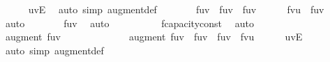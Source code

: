 {\ \ \ \ \isamarkupfalse%
\ {\isacartoucheopen}{\isacharparenleft}u{\isacharcomma}v{\isacharparenright}{\isasymin}E{\isacartoucheclose}\ \isamarkupfalse%
\ {\isacharparenleft}auto\ simp{\isacharcolon}\ augment{\isacharunderscore}def{\isacharparenright}\isanewline
\ \ \isamarkupfalse%
\ \isamarkupfalse%
\ {\isachardoublequoteopen}{\isasymdots}\ {\isasymge}\ f{\isacharparenleft}u{\isacharcomma}v{\isacharparenright}\ {\isacharplus}\ f{\isacharprime}{\isacharparenleft}u{\isacharcomma}v{\isacharparenright}\ {\isacharminus}\ f{\isacharparenleft}u{\isacharcomma}v{\isacharparenright}{\isachardoublequoteclose}\isanewline
\ \ \ \ \isamarkupfalse%
\ {\isacartoucheopen}f{\isacharprime}{\isacharparenleft}v{\isacharcomma}u{\isacharparenright}\ {\isasymle}\ f{\isacharparenleft}u{\isacharcomma}v{\isacharparenright}{\isacartoucheclose}\ \isamarkupfalse%
\ auto\isanewline
\ \ \isamarkupfalse%
\ \isamarkupfalse%
\ {\isachardoublequoteopen}{\isasymdots}\ {\isacharequal}\ f{\isacharprime}{\isacharparenleft}u{\isacharcomma}v{\isacharparenright}{\isachardoublequoteclose}\ \isamarkupfalse%
\ auto\isanewline
\ \ \isamarkupfalse%
\ \isamarkupfalse%
\ {\isachardoublequoteopen}{\isasymdots}\ {\isasymge}\ {}{\isachardoublequoteclose}\ \isamarkupfalse%
\ f{\isacharprime}{\isachardot}capacity{\isacharunderscore}const\ \isamarkupfalse%
\ auto\isanewline
\ \ \isamarkupfalse%
\ \isamarkupfalse%
\ {\isachardoublequoteopen}augment\ f{\isacharprime}{\isacharparenleft}u{\isacharcomma}v{\isacharparenright}\ {\isasymge}\ {}{\isachardoublequoteclose}\ \isacommand{{\isachardot}}\isamarkupfalse%
\isanewline
\ \ \ \ \ \ \isanewline
\ \ \isamarkupfalse%
\ {\isachardoublequoteopen}augment\ f{\isacharprime}{\isacharparenleft}u{\isacharcomma}v{\isacharparenright}\ {\isacharequal}\ f{\isacharparenleft}u{\isacharcomma}v{\isacharparenright}\ {\isacharplus}\ f{\isacharprime}{\isacharparenleft}u{\isacharcomma}v{\isacharparenright}\ {\isacharminus}\ f{\isacharprime}{\isacharparenleft}v{\isacharcomma}u{\isacharparenright}{\isachardoublequoteclose}\isanewline
\ \ \ \ \isamarkupfalse%
\ {\isacartoucheopen}{\isacharparenleft}u{\isacharcomma}v{\isacharparenright}{\isasymin}E{\isacartoucheclose}\ \isamarkupfalse%
\ {\isacharparenleft}auto\ simp{\isacharcolon}\ augment{\isacharunderscore}def{\isacharparenright}\isanewline
}
